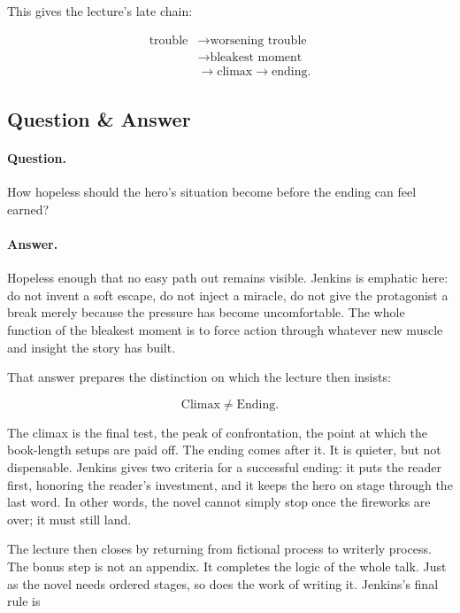 This gives the lecture's late chain:

\begin{equation}
\begin{aligned}
\text{trouble}
&\to \text{worsening trouble} \\
&\to \text{bleakest moment} \\
&\to \text{climax} \to \text{ending}.
\end{aligned}
\end{equation}

\subsection{Question \& Answer}

\paragraph{Question.} How hopeless should the hero's situation become before the ending can feel earned?

\paragraph{Answer.} Hopeless enough that no easy path out remains visible. Jenkins is emphatic here: do not invent a soft escape, do not inject a miracle, do not give the protagonist a break merely because the pressure has become uncomfortable. The whole function of the bleakest moment is to force action through whatever new muscle and insight the story has built.

That answer prepares the distinction on which the lecture then insists:

\begin{equation}
\text{Climax} \neq \text{Ending}.
\end{equation}

The climax is the final test, the peak of confrontation, the point at which the book-length setups are paid off. The ending comes after it. It is quieter, but not dispensable. Jenkins gives two criteria for a successful ending: it puts the reader first, honoring the reader's investment, and it keeps the hero on stage through the last word. In other words, the novel cannot simply stop once the fireworks are over; it must still land.

The lecture then closes by returning from fictional process to writerly process. The bonus step is not an appendix. It completes the logic of the whole talk. Just as the novel needs ordered stages, so does the work of writing it. Jenkins's final rule is

